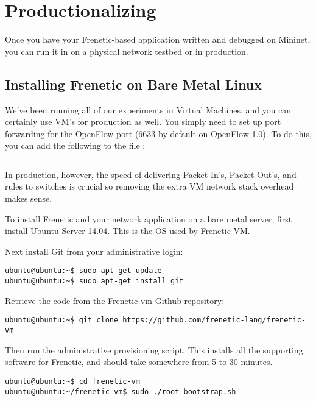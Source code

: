 
\chapter{Productionalizing}

Once you have your Frenetic-based application written and debugged on Mininet, you can run it in on a 
physical network testbed or in production.  

\section{Installing Frenetic on Bare Metal Linux}
 \label{productionalizing:install}
 
We've been running all of our experiments in Virtual Machines, and you can certainly use VM's for
production as well.  You simply need to set up port forwarding for the OpenFlow port (6633 by 
default on OpenFlow 1.0).  To do this, you can add the following to the file :

\inputminted[firstline=29,lastline=30]{ruby}{code/productionalizing/Vagrantfile} 

In production, however, the speed of delivering Packet In's, Packet Out's, and rules to switches is crucial so
removing the extra VM network stack overhead makes sense.

To install Frenetic and your network application on a bare metal server, first install Ubuntu Server 14.04.  
This is the OS used by Frenetic VM.  

Next install Git from your administrative login:

\begin{verbatim}
ubuntu@ubuntu:~$ sudo apt-get update
ubuntu@ubuntu:~$ sudo apt-get install git
\end{verbatim}

Retrieve the code from the Frenetic-vm Github repository:

\begin{verbatim}
ubuntu@ubuntu:~$ git clone https://github.com/frenetic-lang/frenetic-vm
\end{verbatim}

Then run the administrative provisioning script.  This installs all the supporting software for 
Frenetic, and should take somewhere from 5 to 30 minutes.

\begin{verbatim}
ubuntu@ubuntu:~$ cd frenetic-vm
ubuntu@ubuntu:~/frenetic-vm$ sudo ./root-bootstrap.sh 
\end{verbatim}

